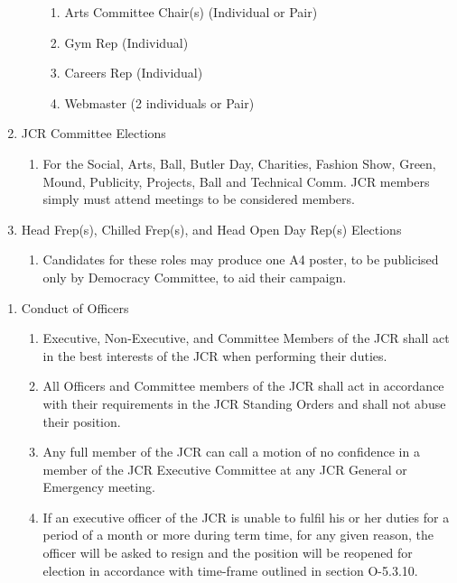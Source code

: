 \begin{enumerate}
\begin{enumerate}
\begin{enumerate}
            \item Arts Committee Chair(s) (Individual or Pair) 
            \item Gym Rep (Individual)
            \item Careers Rep (Individual) 
            \item Webmaster (2 individuals or Pair)
        \end{enumerate}
    \end{enumerate}
    \item JCR Committee Elections
    \begin{enumerate}
        \item For the Social, Arts, Ball, Butler Day, Charities, Fashion Show, Green, Mound, Publicity, Projects, Ball and Technical Comm. JCR members simply must attend meetings to be considered members.
    \end{enumerate}
    \item Head Frep(s), Chilled Frep(s), and Head Open Day Rep(s) Elections
    \begin{enumerate}
        \item Candidates for these roles may produce one A4 poster, to be publicised only by Democracy Committee, to aid their campaign.
    \end{enumerate}
\end{enumerate}

\begin{enumerate}
    \item Conduct of Officers
    \begin{enumerate}
        \item Executive, Non-Executive, and Committee Members of the JCR shall act in the best interests of the JCR when performing their duties.
        \item All Officers and Committee members of the JCR shall act in accordance with their requirements in the JCR Standing Orders and shall not abuse their position.
        \item Any full member of the JCR can call a motion of no confidence in a member of the JCR Executive Committee at any JCR General or Emergency meeting.
        \item If an executive officer of the JCR is unable to fulfil his or her duties for a period of a month or more during term time, for any given reason, the officer will be asked to resign and the position will be reopened for election in accordance with time-frame outlined in section O-5.3.10.
    \end{enumerate}
\end{enumerate}

